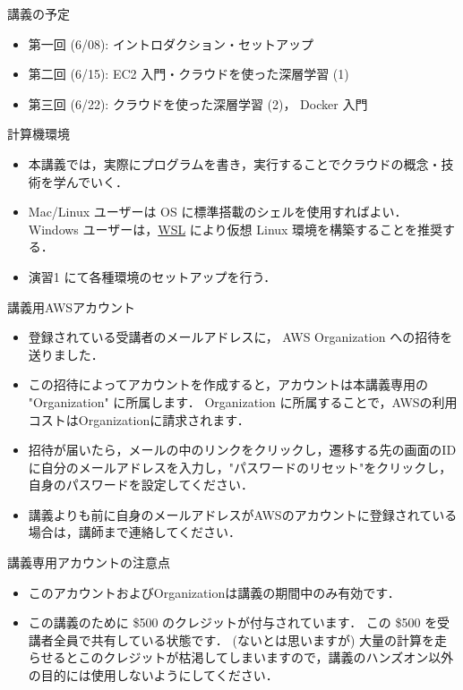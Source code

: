 \documentclass[unicode,11pt]{beamer}
\begin{document}
\begin{frame}{講義の予定}
    \begin{itemize}
        \item 第一回 (6/08): イントロダクション・セットアップ
        \item 第二回 (6/15): EC2 入門・クラウドを使った深層学習 (1)
        \item 第三回 (6/22): クラウドを使った深層学習 (2)， Docker 入門
    \end{itemize}
\end{frame}

\begin{frame}{計算機環境}

\begin{itemize}
    \item 本講義では，実際にプログラムを書き，実行することでクラウドの概念・技術を学んでいく．
    \item Mac/Linux ユーザーは OS に標準搭載のシェルを使用すればよい．
Windows ユーザーは，\href{https://docs.microsoft.com/en-us/windows/wsl/install}{WSL} により仮想 Linux 環境を構築することを推奨する．
    \item 演習1 にて各種環境のセットアップを行う．
\end{itemize}

\end{frame}

\begin{frame}{講義用AWSアカウント}

\begin{itemize}
    \item 登録されている受講者のメールアドレスに， AWS Organization への招待を送りました．
    \item この招待によってアカウントを作成すると，アカウントは本講義専用の "Organization" に所属します．
    \teim Organization に所属することで，AWSの利用コストはOrganizationに請求されます．
    \item 招待が届いたら，メールの中のリンクをクリックし，遷移する先の画面のIDに自分のメールアドレスを入力し，"パスワードのリセット"をクリックし，自身のパスワードを設定してください．
    \item 講義よりも前に自身のメールアドレスがAWSのアカウントに登録されている場合は，講師まで連絡してください．
\end{itemize}

\end{frame}

\begin{frame}{講義専用アカウントの注意点}

\begin{itemize}
    \item このアカウントおよびOrganizationは講義の期間中のみ有効です．
    \item この講義のために \$500 のクレジットが付与されています．
    この \$500 を受講者全員で共有している状態です．
    (ないとは思いますが) 大量の計算を走らせるとこのクレジットが枯渇してしまいますので，講義のハンズオン以外の目的には使用しないようにしてください．
\end{itemize}

\end{frame}
\end{document}
